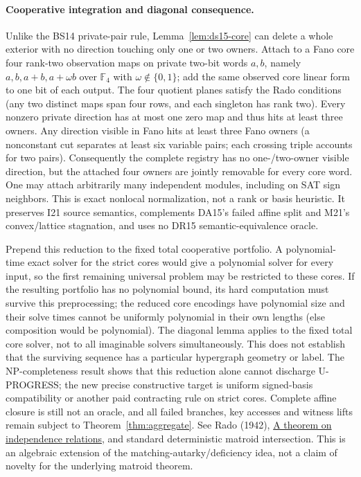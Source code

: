 \documentclass[11pt]{article}
\begin{document}
\paragraph{Cooperative integration and diagonal consequence.}
Unlike the BS14 private-pair rule, Lemma~\ref{lem:ds15-core} can delete a whole exterior with no direction touching only one or two owners. Attach to a Fano core four rank-two observation maps on private two-bit words $a,b$, namely $a,b,a+b,a+\omega b$ over $\mathbb F_4$ with $\omega\notin\{0,1\}$; add the same observed core linear form to one bit of each output. The four quotient planes satisfy the Rado conditions (any two distinct maps span four rows, and each singleton has rank two). Every nonzero private direction has at most one zero map and thus hits at least three owners. Any direction visible in Fano hits at least three Fano owners (a nonconstant cut separates at least six variable pairs; each crossing triple accounts for two pairs). Consequently the complete registry has no one-/two-owner visible direction, but the attached four owners are jointly removable for every core word. One may attach arbitrarily many independent modules, including on SAT sign neighbors. This is exact nonlocal normalization, not a rank or basis heuristic. It preserves I21 source semantics, complements DA15's failed affine split and M21's convex/lattice stagnation, and uses no DR15 semantic-equivalence oracle.

Prepend this reduction to the fixed total cooperative portfolio. A polynomial-time exact solver for the strict cores would give a polynomial solver for every input, so the first remaining universal problem may be restricted to these cores. If the resulting portfolio has no polynomial bound, its hard computation must survive this preprocessing; the reduced core encodings have polynomial size and their solve times cannot be uniformly polynomial in their own lengths (else composition would be polynomial). The diagonal lemma applies to the fixed total core solver, not to all imaginable solvers simultaneously. This does not establish that the surviving sequence has a particular hypergraph geometry or label. The NP-completeness result shows that this reduction alone cannot discharge U-PROGRESS; the new precise constructive target is uniform signed-basis compatibility or another paid contracting rule on strict cores. Complete affine closure is still not an oracle, and all failed branches, key accesses and witness lifts remain subject to Theorem~\ref{thm:aggregate}. See Rado (1942), \href{https://doi.org/10.1093/qmath/os-13.1.83}{A theorem on independence relations}, and standard deterministic matroid intersection. This is an algebraic extension of the matching-autarky/deficiency idea, not a claim of novelty for the underlying matroid theorem.
\end{document}
